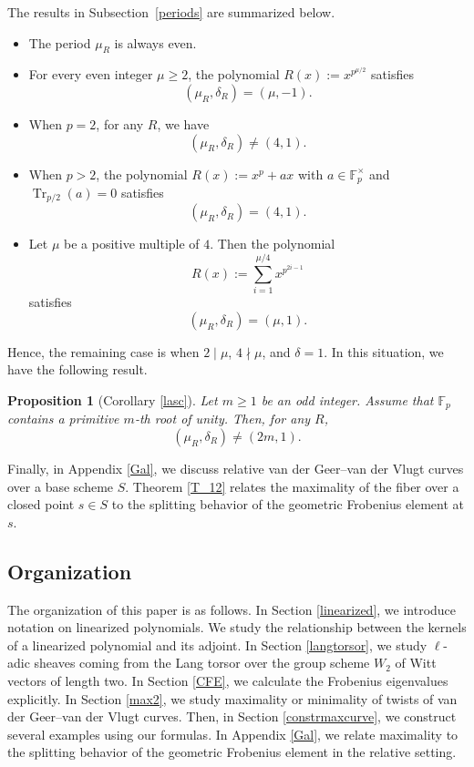 \documentclass[12pt,a4paper]{amsart}
\newtheorem{proposition}[theorem]{Proposition}
\theoremstyle{definition}
\def\F{{\mathbb F}}
\theoremstyle{remark}
\DeclareMathOperator{\Tr}{Tr}
\begin{document}
The results in Subsection~\ref{periods} are summarized below. 
\begin{itemize}
    \item The period $\mu_R$ is always even. 
    \item For every even integer $\mu\geq2$, the polynomial  $R(x):=x^{p^{\mu/2}}$ satisfies 
    \[
    (\mu_R,\delta_R)=(\mu,-1). 
    \]
    \item When $p=2$, for any $R$, we have 
    \[
    (\mu_R,\delta_R)\neq(4,1). 
    \]
    \item When $p>2$, the polynomial $R(x):=x^p+ax$ with $a\in\F_p^\times$ and $\Tr_{p/2}(a)=0$ satisfies 
    \[
    (\mu_R,\delta_R)=(4,1). 
    \]
    \item Let $\mu$ be a positive multiple of $4$. Then the polynomial 
    \[
    R(x):=\sum_{i=1}^{\mu/4}x^{p^{2i-1}}
    \]
    satisfies 
    \[
    (\mu_R,\delta_R)=(\mu,1). 
    \]
\end{itemize}


Hence, the remaining case is when $2\mid \mu$, $4\nmid \mu$, and $\delta=1$. 
In this situation, we have the following result.
\begin{proposition}[Corollary \ref{lasc}]
Let $m\geq1$ be an odd integer. Assume that $\F_p$ contains a primitive $m$-th root of unity. Then, for any $R$, 
\[
(\mu_R,\delta_R)\neq(2m,1). 
\]
\end{proposition}


\medskip


Finally, in Appendix \ref{Gal}, we discuss relative van der Geer--van der Vlugt curves over a base scheme $S$. Theorem \ref{T_12} relates the maximality of the fiber over a closed point $s\in S$ to the splitting behavior of the geometric Frobenius element at $s$. 

\subsection*{Organization}

The organization of this paper is as follows.
In Section \ref{linearized}, we introduce notation on linearized polynomials.
We study the relationship between the kernels of a linearized polynomial and its adjoint.
In Section \ref{langtorsor}, we study $\ell$-adic sheaves coming from the Lang torsor over the group scheme $W_2$ of Witt vectors of length two.
In Section \ref{CFE}, we calculate the Frobenius eigenvalues explicitly.
In Section \ref{max2}, we study maximality or minimality of twists of van der Geer--van der Vlugt curves.
Then, in Section \ref{constrmaxcurve}, we construct several examples  using our formulas. 
In Appendix \ref{Gal}, we relate maximality to the splitting behavior of the geometric Frobenius element in the relative setting.
\end{document}
